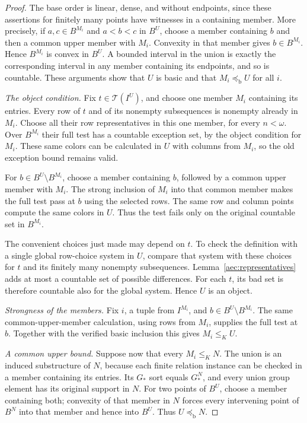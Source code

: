 \begin{proof}
The base order is linear, dense, and without endpoints,
since these assertions for finitely many points have
witnesses in a containing member.  More precisely,
if \(a,c\in B^{M_i}\) and \(a<b<c\) in \(B^U\), choose
a member containing \(b\) and then a common upper member
with \(M_i\).  Convexity in that member gives
\(b\in B^{M_i}\).  Hence \(B^{M_i}\) is convex in
\(B^U\).  A bounded interval in the union is exactly
the corresponding interval in any member containing
its endpoints, and so is countable.  These arguments
show that \(U\) is basic and that
\(M_i\preccurlyeq_{\mathrm b}U\) for all \(i\).

\emph{The object condition.}
Fix \(t\in\mathcal T(I^U)\), and choose one member
\(M_i\) containing its entries.  Every row of \(t\)
and of its nonempty subsequences is nonempty already
in \(M_i\).  Choose all their row representatives in
this one member, for every \(n<\omega\).
Over \(B^{M_i}\) their full test has a countable
exception set, by the object condition for \(M_i\).
These same colors can be calculated in \(U\) with
columns from \(M_i\), so the old exception bound
remains valid.

For \(b\in B^U\setminus B^{M_i}\), choose a member
containing \(b\), followed by a common upper member
with \(M_i\).  The strong inclusion of \(M_i\) into
that common member makes the full test pass at \(b\)
using the selected rows.  The same row and column
points compute the same colors in \(U\).  Thus the
test fails only on the original countable set in
\(B^{M_i}\).

The convenient choices just made may depend on \(t\).
To check the definition with a single global
row-choice system in \(U\), compare that system with
these choices for \(t\) and its finitely many
nonempty subsequences.  Lemma~\ref{aec:representatives}
adds at most a countable set of possible differences.
For each \(t\), its bad set is therefore countable
also for the global system.  Hence \(U\) is an object.

\emph{Strongness of the members.}
Fix \(i\), a tuple from \(I^{M_i}\), and
\(b\in B^U\setminus B^{M_i}\).
The same common-upper-member calculation, using
rows from \(M_i\), supplies the full test at \(b\).
Together with the verified basic inclusion this
gives \(M_i\le_K U\).

\emph{A common upper bound.}
Suppose now that every \(M_i\le_K N\).
The union is an induced substructure of \(N\),
because each finite relation instance can be checked
in a member containing its entries.  Its \(G_*\)
sort equals \(G_*^N\), and every union group
element has its original support in \(N\).
For two points of \(B^U\), choose a member
containing both; convexity of that member in \(N\)
forces every intervening point of \(B^N\) into
that member and hence into \(B^U\).  Thus
\(U\preccurlyeq_{\mathrm b}N\).


\end{proof}
